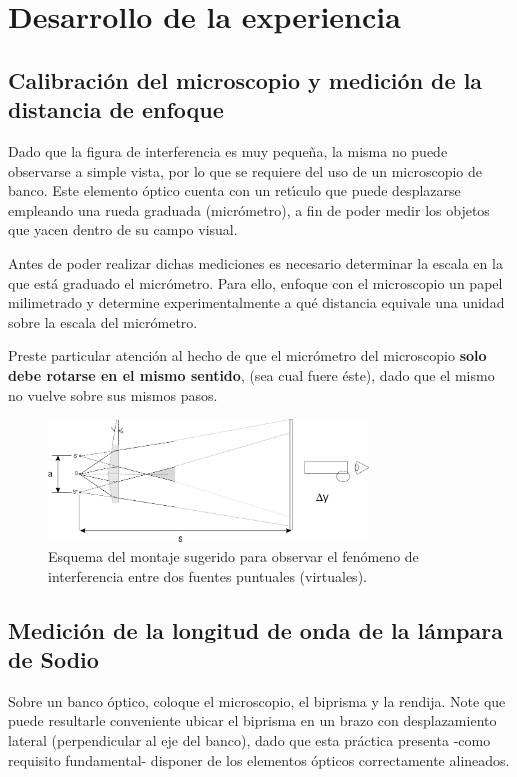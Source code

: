\documentclass[laboratorio]{guia}
\begin{document}
\section{Desarrollo de la experiencia}

\subsection{Calibraci\'on del microscopio y medici\'on de la distancia de
enfoque}

Dado que la figura de interferencia es muy peque\~na, la misma no puede
observarse a simple vista, por lo que se requiere del uso de un microscopio de
banco. Este elemento \'optico cuenta con un ret\'\i culo que puede desplazarse
empleando una rueda graduada (micr\'ometro), a fin de poder medir los objetos
que yacen dentro de su campo visual.

Antes de poder realizar dichas mediciones es necesario determinar la escala en
la que est\'a graduado el micr\'ometro. Para ello, enfoque con el microscopio
un papel milimetrado y determine experimentalmente a qu\'e distancia equivale
una unidad sobre la escala del micr\'ometro.

Preste particular atenci\'on al hecho de que el micr\'ometro del microscopio
{\bf solo debe rotarse en el mismo sentido}, (sea cual fuere \'este), dado que
el mismo no vuelve sobre sus mismos pasos. 

\begin{figure}[t!]
    \centering
    \includegraphics[width=8.5cm]{LG09--000.png}
    \caption{Esquema del montaje sugerido para observar el fen\'omeno de
    interferencia entre dos fuentes puntuales (virtuales).}
    \label{fig:1}
\end{figure}



\subsection{Medici\'on de la longitud de onda de la l\'ampara de Sodio}

Sobre un banco \'optico, coloque el microscopio, el biprisma y la rendija. Note
que puede resultarle conveniente 
ubicar el biprisma en un brazo con desplazamiento lateral
(perpendicular al eje del banco), dado que esta pr\'actica presenta -como
requisito fundamental- disponer de los elementos \'opticos correctamente
alineados. 
\end{document}

